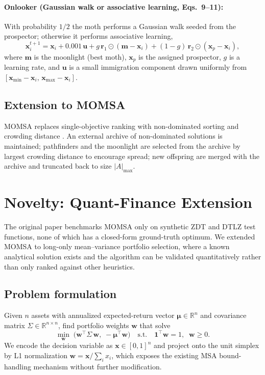 \documentclass[11pt,a4paper]{article}
\begin{document}
\paragraph{Onlooker (Gaussian walk or associative learning, Eqs.~9--11):}
With probability $1/2$ the moth performs a Gaussian walk seeded from
the prospector; otherwise it performs associative learning,
\begin{equation}
\mathbf{x}_i^{t+1} = \mathbf{x}_i + 0.001\,\mathbf{u}
+ g\,\mathbf{r}_1 \odot (\mathbf{m} - \mathbf{x}_i)
+ (1-g)\,\mathbf{r}_2 \odot (\mathbf{x}_p - \mathbf{x}_i),
\label{eq:onlooker}
\end{equation}
where $\mathbf{m}$ is the moonlight (best moth), $\mathbf{x}_p$ is the
assigned prospector, $g$ is a learning rate, and $\mathbf{u}$ is a
small immigration component drawn uniformly from
$[\mathbf{x}_{\min}-\mathbf{x}_i,\,\mathbf{x}_{\max}-\mathbf{x}_i]$.

\subsection{Extension to MOMSA}

MOMSA replaces single-objective ranking with non-dominated sorting and
crowding distance \cite{deb2002nsga2}. An external archive of
non-dominated solutions is maintained; pathfinders and the moonlight
are selected from the archive by largest crowding distance to encourage
spread; new offspring are merged with the archive and truncated back to
size $|A|_{\max}$.

\section{Novelty: Quant-Finance Extension}
\label{sec:novelty}

The original paper benchmarks MOMSA only on synthetic ZDT and DTLZ test
functions, none of which has a closed-form ground-truth optimum. We
extended MOMSA to long-only mean--variance portfolio selection, where a
known analytical solution exists and the algorithm can be validated
quantitatively rather than only ranked against other heuristics.

\subsection{Problem formulation}

Given $n$ assets with annualized expected-return vector
$\bm{\mu} \in \mathbb{R}^n$ and covariance matrix
$\Sigma \in \mathbb{R}^{n\times n}$, find portfolio weights
$\mathbf{w}$ that solve
\begin{equation}
\min_{\mathbf{w}} \;\bigl( \mathbf{w}^\top \Sigma\, \mathbf{w}, \; -\bm{\mu}^\top \mathbf{w} \bigr)
\quad \text{s.t.}\quad
\mathbf{1}^\top \mathbf{w} = 1, \;\; \mathbf{w} \geq 0.
\label{eq:portfolio}
\end{equation}
We encode the decision variable as $\mathbf{x}\in[0,1]^n$ and project
onto the unit simplex by L1 normalization
$\mathbf{w} = \mathbf{x} / \sum_i x_i$, which exposes the existing MSA
bound-handling mechanism without further modification.
\end{document}
